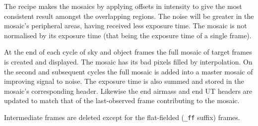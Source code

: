 \documentclass[twoside,11pt,nolof]{starlink}
\begin{document}
{{{         \sstitem
         The recipe makes the mosaics by applying offsets in intensity
         to give the most consistent result amongst the overlapping regions.
         The noise will be greater in the mosaic's peripheral areas, having
         received less exposure time.  The mosaic is not normalised by its
         exposure time (that being the exposure time of a single frame).

         \sstitem
         At the end of each cycle of sky and object frames the full
         mosaic of target frames is created and displayed.  The mosaic has
         its bad pixels filled by interpolation.  On the second and
         subsequent cycles the full mosaic is added into a master mosaic of
         improving signal to noise.  The exposure time is also summed and
         stored in the mosaic's corresponding header.  Likewise the end
         airmass and end UT headers are updated to match that of
         the last-observed frame contributing to the mosaic.

         \sstitem
         Intermediate frames are deleted except for the flat-fielded ({\tt\_ff}
         suffix) frames.
      }
   }
   }
\end{document}
